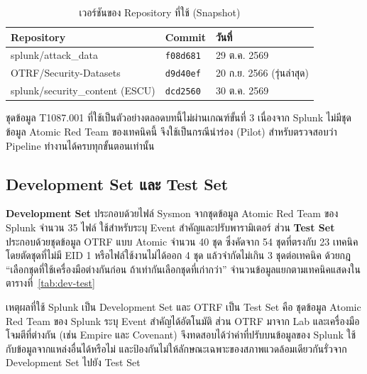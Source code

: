 \begin{table}[ht]
  \centering
  \caption{เวอร์ชันของ Repository ที่ใช้ (Snapshot)}
  \label{tab:snapshot}
  \small
  \begin{tabular}{|l|l|l|}
    \hline
    \textbf{Repository} & \textbf{Commit} & \textbf{วันที่} \\ \hline
    splunk/attack\_data & \texttt{f08d681} & 29 ต.ค. 2569 \\ \hline
    OTRF/Security-Datasets & \texttt{d9d40ef} & 20 ก.ย. 2566 (รุ่นล่าสุด) \\ \hline
    splunk/security\_content (ESCU) & \texttt{dcd2560} & 30 ต.ค. 2569 \\ \hline
  \end{tabular}
\end{table}

ชุดข้อมูล T1087.001 ที่ใช้เป็นตัวอย่างตลอดบทนี้ไม่ผ่านเกณฑ์ขั้นที่ 3
เนื่องจาก Splunk ไม่มีชุดข้อมูล Atomic Red Team ของเทคนิคนี้
จึงใช้เป็นกรณีนำร่อง (Pilot) สำหรับตรวจสอบว่า Pipeline ทำงานได้ครบทุกขั้นตอนเท่านั้น

\subsection{Development Set และ Test Set}
\textbf{Development Set} ประกอบด้วยไฟล์ Sysmon จากชุดข้อมูล Atomic Red Team ของ Splunk จำนวน 35 ไฟล์
ใช้สำหรับระบุ Event สำคัญและปรับพารามิเตอร์ ส่วน \textbf{Test Set} ประกอบด้วยชุดข้อมูล OTRF แบบ Atomic จำนวน 40 ชุด
ซึ่งคัดจาก 54 ชุดที่ตรงกับ 23 เทคนิค โดยตัดชุดที่ไม่มี EID 1 หรือไฟล์ใช้งานไม่ได้ออก 4 ชุด
แล้วจำกัดไม่เกิน 3 ชุดต่อเทคนิค ด้วยกฎ ``เลือกชุดที่ใช้เครื่องมือต่างกันก่อน ถ้าเท่ากันเลือกชุดที่เก่ากว่า''
จำนวนข้อมูลแยกตามเทคนิคแสดงในตารางที่~\ref{tab:dev-test}

เหตุผลที่ใช้ Splunk เป็น Development Set และ OTRF เป็น Test Set คือ
ชุดข้อมูล Atomic Red Team ของ Splunk ระบุ Event สำคัญได้อัตโนมัติ
ส่วน OTRF มาจาก Lab และเครื่องมือโจมตีที่ต่างกัน (เช่น Empire และ Covenant)
จึงทดสอบได้ว่าค่าที่ปรับบนข้อมูลของ Splunk ใช้กับข้อมูลจากแหล่งอื่นได้หรือไม่
และป้องกันไม่ให้ลักษณะเฉพาะของสภาพแวดล้อมเดียวกันรั่วจาก Development Set ไปยัง Test Set

